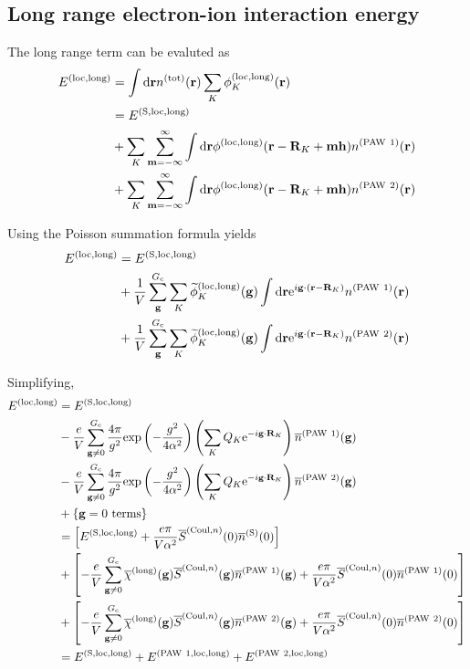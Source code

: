 \documentclass[paper=a4, fontsize=11pt]{article} %
\numberwithin{equation}{section} %
\numberwithin{figure}{section} %
\numberwithin{table}{section} %
\newcommand{\wt}{\widetilde}
\newcommand{\ol}{\overline}
\newcommand{\bh}{{\bf{h}}}
\newcommand{\bm}{{\bf{m}}}
\newcommand{\bg}{{\bf{g}}}
\newcommand{\br}{{\bf{r}}}
\newcommand{\bR}{{\bf{R}}}
\newcommand{\rexp}{{\mathrm{exp}}}
\newcommand{\rS}{{\mathrm{S}}}
\newcommand{\re}{{\mathrm{e}}}
\newcommand{\rCo}{{\mathrm{Coul}}}
\newcommand{\rlong}{{\mathrm{long}}}
\newcommand{\rP}{{\mathrm{PAW}}}
\newcommand{\rd}{{\mathrm{d}}}
\newcommand{\rlo}{{\mathrm{loc}}}
\newcommand{\rtot}{{\mathrm{tot}}}
\newcommand{\ibgR}{i\bg\cdot\bR}
\newcommand{\Gc}{{G_{\mathrm{c}}}}
\begin{document}
\subsection{Long range electron-ion interaction energy}
The long range term can be evaluted as
\begin{equation} \label{eq:lloc}
\begin{split}
E^{(\rlo,\rlong)}
&= \int \rd \br n^{(\rtot)}(\br) \sum_K\phi_K^{(\rlo,\rlong)}(\br)\\
&= E^{(\rS,\rlo,\rlong)} \\
& + \sum_{K}\sum_{\bf{m}=-\infty}^\infty \int \rd\br \phi^{(\rlo,\rlong)}(\br-\bR_{K}+\bm\bh) n^{(\rP\ 1)}(\br)\\
& + \sum_{K}\sum_{\bf{m}=-\infty}^\infty \int \rd\br \phi^{(\rlo,\rlong)}(\br-\bR_{K}+\bm\bh) n^{(\rP\ 2)}(\br) \\
\end{split}
\end{equation}

Using the Poisson summation formula yields
\begin{equation}
\begin{split}
E^{(\rlo,\rlong)}
&= E^{(\rS,\rlo,\rlong)} \\
&+ \frac{1}{V} \sum_\bg^\Gc \sum_{K} \wt \phi_K^{(\rlo,\rlong)} (\bg)\int \rd\br \re^{i\bg\cdot(\br-\bR_{K})}n^{(\rP\ 1)}(\br) \\
&+ \frac{1}{V} \sum_\bg^\Gc \sum_{K} \wt \phi_K^{(\rlo,\rlong)} (\bg)\int \rd\br \re^{i\bg\cdot(\br-\bR_{K})}n^{(\rP\ 2)}(\br) \\
\end{split}
\end{equation}

Simplifying,
\begin{equation}
\begin{split}
E^{(\rlo,\rlong)}
& = E^{(\rS,\rlo,\rlong)} \\
& - \frac{e}{V} \sum_{\bg \neq 0}^{\Gc} \frac{4\pi}{g^2} \rexp\left(-\frac{g^2}{4\alpha^2}\right) \left(\sum_{K} Q_K \re^{-\ibgR_{K}}\right) \ol n^{(\rP\ 1)}(\bg)\\
& - \frac{e}{V} \sum_{\bg \neq 0}^{\Gc} \frac{4\pi}{g^2} \rexp\left(-\frac{g^2}{4\alpha^2}\right) \left(\sum_{K} Q_K \re^{-\ibgR_{K}}\right) \ol n^{(\rP\ 2)}(\bg)\\
&+ \left\{\bg=0\ \mathrm{terms}\right\}\\
& = \left[ E^{(\rS,\rlo,\rlong)} + \frac{e\pi}{V \alpha^2} \ol S^{(\rCo,n)}(0) \ol n^{(\rS)}(0)\right] \\
&+ \left[-\frac{e}{V} \sum_{\bg \neq 0}^{\Gc} \ol \chi^{(\rlong)}(\bg)  \ol S^{(\rCo,n)}(\bg) \ol n^{(\rP\ 1)}(\bg)+ \frac{e\pi}{V \alpha^2} \ol S^{(\rCo,n)}(0) \ol n^{(\rP\ 1)}(0)\right] \\
&+ \left[-\frac{e}{V} \sum_{\bg \neq 0}^{\Gc} \ol \chi^{(\rlong)}(\bg)  \ol S^{(\rCo,n)}(\bg) \ol n^{(\rP\ 2)}(\bg)+ \frac{e\pi}{V \alpha^2} \ol S^{(\rCo,n)}(0) \ol n^{(\rP\ 2)}(0)\right] \\
&= E^{(\rS,\rlo,\rlong)} + E^{(\rP\ 1,\rlo,\rlong)}  + E^{(\rP\ 2,\rlo,\rlong)}
\end{split}
\end{equation}
\end{document}
